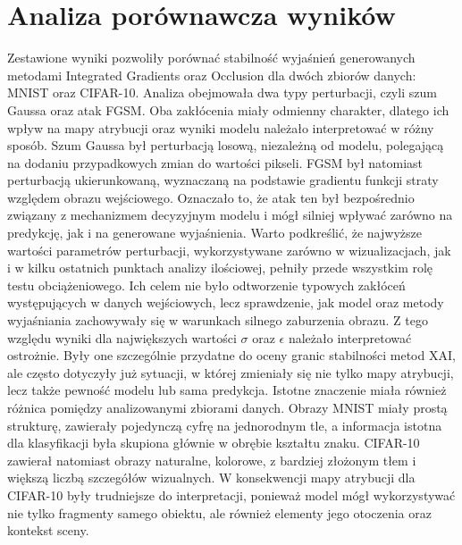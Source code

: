 \chapter{Analiza porównawcza wyników}

Zestawione wyniki pozwoliły porównać stabilność wyjaśnień generowanych metodami Integrated Gradients oraz Occlusion dla dwóch zbiorów danych: MNIST oraz CIFAR-10. Analiza obejmowała dwa typy perturbacji, czyli szum Gaussa oraz atak FGSM. Oba zakłócenia miały odmienny charakter, dlatego ich wpływ na mapy atrybucji oraz wyniki modelu należało interpretować w różny sposób. Szum Gaussa był perturbacją losową, niezależną od modelu, polegającą na dodaniu przypadkowych zmian do wartości pikseli. FGSM był natomiast perturbacją ukierunkowaną, wyznaczaną na podstawie gradientu funkcji straty względem obrazu wejściowego. Oznaczało to, że atak ten był bezpośrednio związany z mechanizmem decyzyjnym modelu i mógł silniej wpływać zarówno na predykcję, jak i na generowane wyjaśnienia.
Warto podkreślić, że najwyższe wartości parametrów perturbacji, wykorzystywane zarówno w wizualizacjach, jak i w kilku ostatnich punktach analizy ilościowej, pełniły przede wszystkim rolę testu obciążeniowego. Ich celem nie było odtworzenie typowych zakłóceń występujących w danych wejściowych, lecz sprawdzenie, jak model oraz metody wyjaśniania zachowywały się w warunkach silnego zaburzenia obrazu. Z tego względu wyniki dla największych wartości $\sigma$ oraz $\epsilon$ należało interpretować ostrożnie. Były one szczególnie przydatne do oceny granic stabilności metod XAI, ale często dotyczyły już sytuacji, w której zmieniały się nie tylko mapy atrybucji, lecz także pewność modelu lub sama predykcja. Istotne znaczenie miała również różnica pomiędzy analizowanymi zbiorami danych. Obrazy MNIST miały prostą strukturę, zawierały pojedynczą cyfrę na jednorodnym tle, a informacja istotna dla klasyfikacji była skupiona głównie w obrębie kształtu znaku. CIFAR-10 zawierał natomiast obrazy naturalne, kolorowe, z bardziej złożonym tłem i większą liczbą szczegółów wizualnych. W konsekwencji mapy atrybucji dla CIFAR-10 były trudniejsze do interpretacji, ponieważ model mógł wykorzystywać nie tylko fragmenty samego obiektu, ale również elementy jego otoczenia oraz kontekst sceny.

